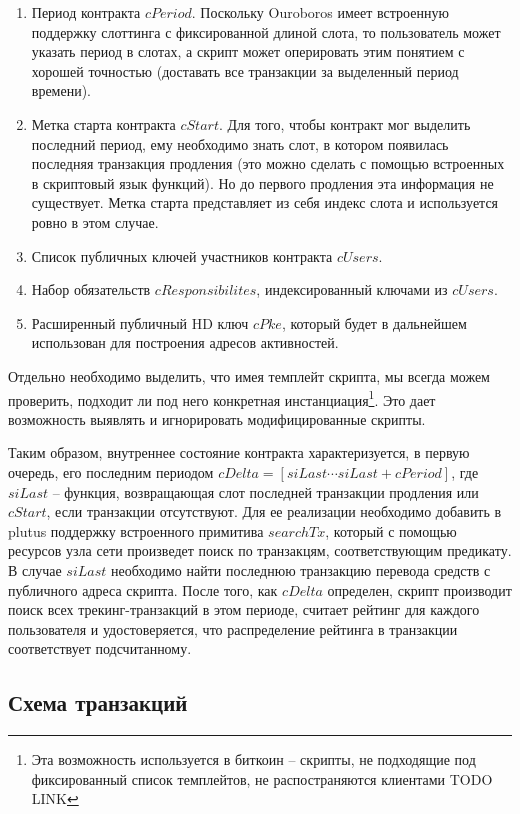 \documentclass[]{itmo-student-thesis}
\begin{document}
\begin{enumerate}
\item Период контракта $cPeriod$. Поскольку Ouroboros имеет встроенную
  поддержку слоттинга с фиксированной длиной слота, то пользователь
  может указать период в слотах, а скрипт может оперировать этим
  понятием с хорошей точностью (доставать все транзакции за выделенный
  период времени).
\item Метка старта контракта $cStart$. Для того, чтобы контракт мог
  выделить последний период, ему необходимо знать слот, в котором
  появилась последняя транзакция продления (это можно сделать с
  помощью встроенных в скриптовый язык функций). Но до первого
  продления эта информация не существует. Метка старта представляет из
  себя индекс слота и используется ровно в этом случае.
\item Список публичных ключей участников контракта $cUsers$.
\item Набор обязательств $cResponsibilites$, индексированный ключами
  из $cUsers$.
\item Расширенный публичный HD ключ $cPke$, который будет в дальнейшем
  использован для построения адресов активностей.
\end{enumerate}

Отдельно необходимо выделить, что имея темплейт скрипта, мы всегда
можем проверить, подходит ли под него конкретная
инстанциация\footnote{Эта возможность используется в биткоин --
скрипты, не подходящие под фиксированный список темплейтов, не
распостраняются клиентами TODO LINK}. Это дает возможность выявлять и
игнорировать модифицированные скрипты.

Таким образом, внутреннее состояние контракта характеризуется, в
первую очередь, его последним периодом $cDelta = [siLast \cdots
siLast+cPeriod]$, где $siLast$ -- функция, возвращающая слот
последней транзакции продления или $cStart$, если транзакции
отсутствуют. Для ее реализации необходимо добавить в plutus поддержку
встроенного примитива $searchTx$, который с помощью ресурсов узла сети
произведет поиск по транзакцям, соответствующим предикату. В случае
$siLast$ необходимо найти последнюю транзакцию перевода средств с
публичного адреса скрипта. После того, как $cDelta$ определен, скрипт
производит поиск всех трекинг-транзакций в этом периоде, считает
рейтинг для каждого пользователя и удостоверяется, что распределение
рейтинга в транзакции соответствует подсчитанному.

\subsection{Схема транзакций}
\end{document}
